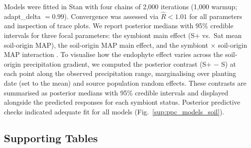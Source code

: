 \documentclass[12pt]{article}\usepackage[]{graphicx}\usepackage[dvipsnames]{xcolor}
\begin{document}
Models were fitted in Stan \citep{Rstan} with four chains of 2,000 iterations (1,000 warmup; adapt\_delta $= 0.99$). Convergence was assessed via $\hat{R} < 1.01$ for all parameters and inspection of trace plots.
We report posterior medians with 95\% credible intervals for three focal parameters: the symbiont main effect (S+ vs.\ S\textminus at mean soil-origin MAP), the soil-origin MAP main effect, and the symbiont $\times$ soil-origin MAP interaction . 
To visualise how the endophyte effect varies across the soil-origin precipitation gradient, we computed the posterior contrast (S+ $-$ S\textminus) 
at each point along the observed precipitation range, marginalising over planting date (set to the mean) and source population random effects. 
These contrasts are summarised as posterior medians with 95\% credible intervals and displayed alongside the predicted responses for each symbiont 
status. 
Posterior predictive checks indicated adequate fit for all models (Fig.~\ref{sup:ppc_models_soil}).
\clearpage

\subsection*{Supporting Tables}
\begin{table}
    \centering
    \small
    
    \caption{Geographic coordinates and descriptions of source populations for study species. For each source population, the table shows the total number of plants included in the experiment, the number of unique genotypes, and the average clonal replication per genotype.}
    \label{tab:source_pop}
\end{table}
\clearpage

\begin{table}[ht]
    \centering
    \caption{Summary of symbiont removal treatments by species and population.
    N indicates the number of plants tested for symbiont status and
    \%S+ indicates the proportion that tested positive.
    Treatment refers to the symbiont removal treatment applied to the seed lineage: Control (no treatment) or Heat (5 days in a drying oven at 60\degree C for \emph{E. virginicus} and \emph{P. autumnalis}; 12 minutes in a 60\degree C water bath for \emph{A. hyemalis}).
    For all populations except SFAEF and PALM, heat-treated seed lineages were one or more generations removed from the treatment; for those two populations, plants from heat-treated seeds were used directly in the experiment.}
    \label{tab:heat_treatment}
    
\end{table}
\clearpage
\end{document}
